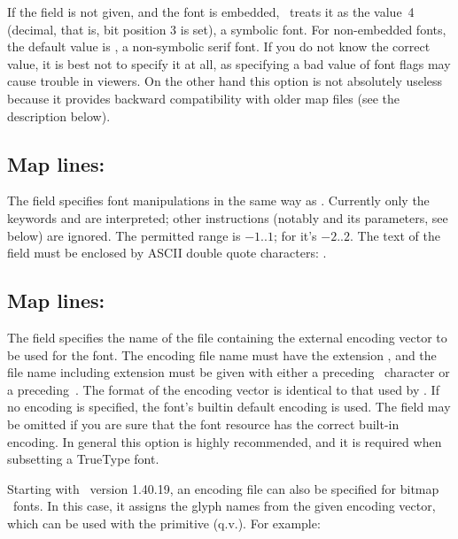\documentclass{pdftexmanual}
\begin{document}
If the  field is not given, and the font is embedded,
\PDFTEX\ treats it as the value~4 (decimal, that is, bit position 3 is
set), a symbolic font. For non-embedded fonts, the default value is
, a non-symbolic serif font. If you do not know the correct
value, it is best not to specify it at all, as specifying a bad value of
font flags may cause trouble in viewers. On the other hand this option
is not absolutely useless because it provides backward compatibility
with older map files (see the  description below).

\subsection{Map lines: }

The  field specifies font manipulations in the same way
as . Currently only the keywords  and
 are interpreted; other instructions (notably
 and its parameters, see  below)
are ignored. The permitted  range is $-1..1$; for
 it's $-2..2$. The text of the  field
must be enclosed by ASCII double quote characters: .

\subsection{Map lines: }

The  field specifies the name of the file
containing the external encoding vector to be used for the font. The
encoding file name must have the extension , and the file
name including extension must be given with either a preceding~\type{<}
character or a preceding~\type{<[}. The format of the encoding vector is
identical to that used by . If no encoding is specified, the
font's built\hyph in default encoding is used. The
 field may be omitted if you are sure that the
font resource has the correct built-in encoding. In general this option
is highly recommended, and it is required when subsetting a TrueType
font.

Starting with \PDFTEX\ version 1.40.19, an encoding file can also be
specified for bitmap \PK\ fonts. In this case, it assigns the glyph
names from the given encoding vector, which can be used with the
 primitive (q.v.). For example:
\end{document}
